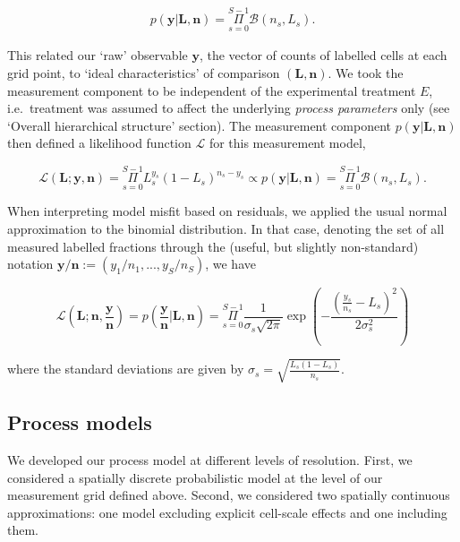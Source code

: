 \documentclass[10pt,letterpaper]{article}
\begin{document}
\begin{align}p(\mathbf{y}|\mathbf{L},\mathbf{n}) = \underset{s=0}{\overset{S-1}{\Pi}}\mathcal{B}(n_s,L_s).\end{align}

This related our `raw' observable \(\mathbf{y}\), the vector of counts
of labelled cells at each grid point, to `ideal characteristics' of
comparison \((\mathbf{L},\mathbf{n})\). We took the measurement
component to be independent of the experimental treatment \(E\),
i.e.~treatment was assumed to affect the underlying \emph{process
parameters} only (see `Overall hierarchical structure' section). The
measurement component \(p(\mathbf{y}|\mathbf{L},\mathbf{n})\) then
defined a likelihood function \(\mathcal{L}\) for this measurement
model,

\begin{equation}\mathcal{L}(\mathbf{L};\mathbf{y},\mathbf{n}) = \underset{s=0}{\overset{S-1}{\Pi}}
L_s^{y_s}(1-L_s)^{n_s-y_s} \propto p(\mathbf{y}|\mathbf{L},\mathbf{n}) = \underset{s=0}{\overset{S-1}{\Pi}}\mathcal{B}(n_s,L_s).\label{eq:likel-binom}\end{equation}

When interpreting model misfit based on residuals, we applied the usual
normal approximation to the binomial distribution. In that case,
denoting the set of all measured labelled fractions through the (useful,
but slightly non-standard) notation
\(\mathbf{y}/\mathbf{n} := (y_1/n_1,...,y_S/n_S)\), we have

\begin{equation}\mathcal{L}(\mathbf{L};\mathbf{n},\frac{\mathbf{y}}{\mathbf{n}}) = p(\frac{\mathbf{y}}{\mathbf{n}}|\mathbf{L},\mathbf{n}) =
\underset{s=0}{\overset{S-1}{\Pi}} \frac{1}{\sigma_s
\sqrt{2\pi}}\exp{(-\frac{(\frac{y_s}{n_s}-L_s)^2}{2\sigma_s^2})}\label{eq:likel-norma}\end{equation}

where the standard deviations are given by
\(\sigma_s = \sqrt{\frac{L_s(1-L_s)}{n_s}}\).

\subsection{Process models}\label{process-models}

We developed our process model at different levels of resolution. First,
we considered a spatially discrete probabilistic model at the level of
our measurement grid defined above. Second, we considered two spatially
continuous approximations: one model excluding explicit cell-scale
effects and one including them.
\end{document}
